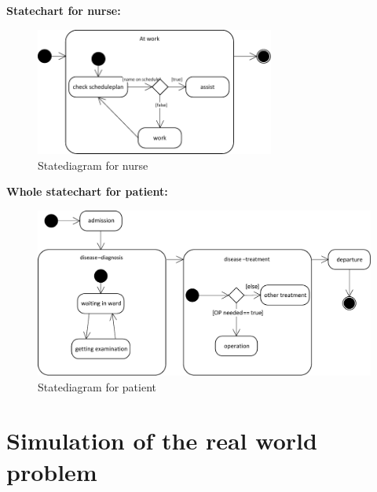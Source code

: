  
    \textbf{Statechart for nurse:}
\begin{figure}[!htb]
  \centering  
  \includegraphics[width=0.7\textwidth]{pics/ub3/b/1b_nurse_stat} 
  \caption{Statediagram for nurse} 
  \label{fig:1b_nurse_stat} 
 \end{figure}

\newpage 
\textbf{Whole statechart for patient:}
\begin{figure}[!htb]
  \centering  
  \includegraphics[width=1\textwidth]{pics/ub3/b/1b_pat_stat} 
  \caption{Statediagram for patient}
  \label{fig:1b_pat_stat} 
 \end{figure}
 
 
 \section{Simulation of the real world problem}
